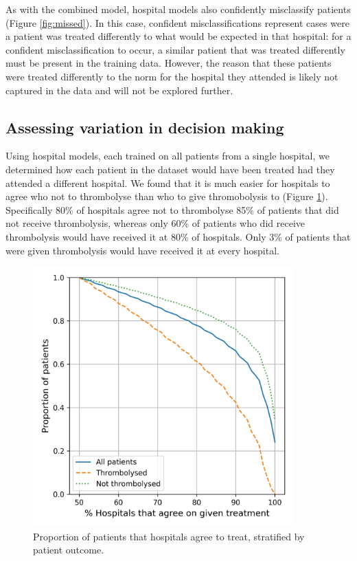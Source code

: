\documentclass[12pt,a4paper, pdftex]{elsarticle}
\begin{document}
As with the combined model, hospital models also confidently misclassify patients (Figure \ref{fig:missed}). In this case, confident misclassifications represent cases were a patient was treated differently to what would be expected in that hospital: for a confident misclassification to occur, a similar patient that was treated differently must be present in the training data. However, the reason that these patients were treated differently to the norm for the hospital they attended is likely not captured in the data and will not be explored further.

\subsection{Assessing variation in decision making}

Using hospital models, each trained on all patients from a single hospital, we determined how each patient in the dataset would have been treated had they attended a different hospital. We found that it is much easier for hospitals to agree who not to thrombolyse than who to give thromobolysis to (Figure \ref{fig:aggree}). Specifically 80\% of hospitals agree not to thrombolyse 85\% of patients that did not receive thrombolysis, whereas only 60\% of patients who did receive thrombolysis would have received it at 80\% of hospitals. Only 3\% of patients that were given thrombolysis would have received it at every hospital.

\begin{figure}[ht!]
\centering
\includegraphics[width=10cm]{figures/agreement_x_hospital_single.jpg}
\caption{Proportion of patients that hospitals agree to treat, stratified by patient outcome.}
\label{fig:aggree}
\end{figure}
\end{document}
